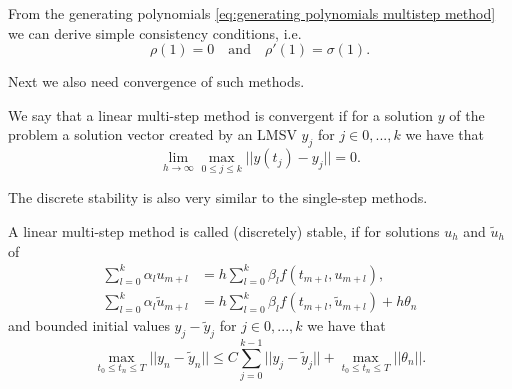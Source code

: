 	From the generating polynomials \eqref{eq:generating polynomials multistep method} we can derive simple consistency conditions, i.e.
	\begin{displaymath}
		\rho(1) = 0 \quad \text{and} \quad \rho'(1) = \sigma(1).
	\end{displaymath}

	Next we also need convergence of such methods.
	
	\begin{definition} \label{def: LMSV convergence}
		We say that a linear multi-step method is convergent if for a solution $y$ of the problem a solution vector created by an LMSV $y_j$ for $j \in {0,...,k}$ we have that
		\begin{displaymath}
			\lim\limits_{h \to \infty} \max_{0 \leq j \leq k} ||y(t_j) - y_j|| = 0.
		\end{displaymath}
	\end{definition}
	
	
	The discrete stability is also very similar to the single-step methods.
	\begin{definition} \label{discrete stability LMSM}
		A linear multi-step method is called (discretely) stable, if for solutions $u_h$ and $\tilde{u}_h$ of
		\begin{align}
			\sum_{l=0}^{k} \alpha_l u_{m+l} &= h \sum_{l=0}^{k} \beta_l f(t_{m+l}, u_{m+l}), \\
			\sum_{l=0}^{k} \alpha_l \tilde{u}_{m+l} &= h \sum_{l=0}^{k} \beta_l f(t_{m+l}, \tilde{u}_{m+l}) + h\theta_n
		\end{align} 
		and bounded initial values $y_j - \tilde{y}_j$ for $j \in {0,...,k}$ we have that
		\begin{displaymath}
			\max_{t_0 \leq t_n \leq T} ||y_n - \tilde{y}_n|| \leq C \sum_{j=0}^{k-1} ||y_j - \tilde{y}_j|| + \max_{t_0 \leq t_n \leq T} ||\theta_n||.
		\end{displaymath}
	\end{definition}
	
	
